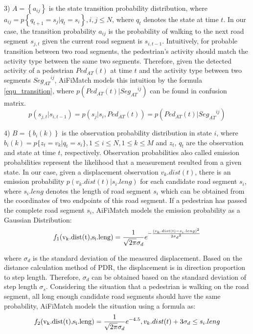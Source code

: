 \documentclass{llncs}
\begin{document}
3) $A = \left\{ {{a_{ij}}} \right\}$ is the state transition probability distribution, where \\ ${a_{ij}} = p\left\{ {{q_{t + 1}} = {s_j}|{q_t} = {s_i}} \right\}, i, j \le N$, where ${q_t}$ denotes the state at time $t$. In our case, the transition probability $a_{ij}$ is the probability of walking to the next road segment $s_{j,t}$ given the current road segment is $s_{i,t-1}$. Intuitively, for probable transition between two road segments, the pedestrian's activity should match the activity type between the same two segments. Therefore, given the detected activity of a pedestrian ${Ped_{AT}}(t)$ at time $t$ and the activity type between two segments ${Seg_{AT}}^{ij}$, AiFiMatch models this intuition by the formula \ref{equ_transition}, where $p({Ped_{AT}}(t)|{Seg_{AT}}^{ij})$ can be found in confusion matrix.
\begin{equation}
\label{equ_transition}
p({s_{j,t}}|{s_{i,t - 1}}) = p({s_j}|{s_i},{Ped_{AT}}(t)) = p({Ped_{AT}}(t)|{Seg_{AT}}^{ij})
\end{equation}

4) $B = \left\{ {{b_i}(k)} \right\}$ is the observation probability distribution in state $i$, where ${b_i}(k) = p\{ {z_t} = {v_k}|{q_t} = {s_i}\},1 \le i \le N,1 \le k \le M$ and $z_t$, $q_t$ are the observation and state at time $t$, respectively. Observation probabilities also called emission probabilities represent the likelihood that a measurement resulted from a given state. In our case, given a displacement observation ${v_k}.dist(t)$, there is an emission probability $p({v_k}.dist(t)|{s_i}.leng)$ for each candidate road segment $s_i$, where ${s_i}.leng$ denotes the length of road segment $s_i$ which can be obtained from the coordinates of two endpoints of this road segment. If a pedestrian has passed the complete road segment $s_i$, AiFiMatch models the emission probability as a Gaussian Distribution:
\begin{equation}
\label{equ_emission1}
{f_1}({\rm{v_k}}{\rm{.dist(t),}}{{\rm{s}}_{\rm{i}}}{\rm{.leng}}) = \frac{1}{{\sqrt {2\pi } {\sigma _d}}}{e^{ - \frac{{{{({v_k}.dist(t) - {s_i}.leng)}^2}}}{{2{{\sigma}_d}^2}}}}
\end{equation}

where ${\sigma}_d$ is the standard deviation of the measured displacement. Based on the distance calculation method of PDR, the displacement is in direction proportion to step length. Therefore, ${\sigma}_d$ can be obtained based on the standard deviation of step length ${\sigma}_s$. Considering the situation that a pedestrian is walking on the road segment, all long enough candidate road segments should have the same probability, AiFiMatch models the situation using a formula as:
\begin{equation}
{f_2}({\rm{v_k}}{\rm{.dist(t),}}{{\rm{s}}_{\rm{i}}}{\rm{.leng}}) = \frac{1}{{\sqrt {2\pi } {\sigma _d}}}{e^{-4.5}},{v_k}.dist(t) + 3{\sigma _d} \le {s_i}.leng
\end{equation}
\end{document}
